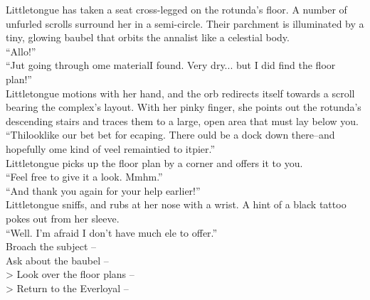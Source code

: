 Littletongue has taken a seat cross-legged on the rotunda’s floor. A number of unfurled scrolls surround her in a semi-circle. Their parchment is illuminated by a tiny, glowing baubel that orbits the annalist like a celestial body.\\

“Allo!”\\

“Ju\lisp t going through \lisp ome material\lispx I found. Very dry... but I did find the floor plan!”\\

Littletongue motions with her hand, and the orb redirects itself towards a scroll bearing the complex’s layout. With her pinky finger, she points out the rotunda’s descending stairs and traces them to a large, open area that must lay below you.\\

“Thi\lispx look\lispx like our be\lisp t bet for e\lisp caping. There \lisp ould be a dock down there--and hopefully \lisp ome kind of ve\lisp el remain\lispx tied to it\lispx pier.”\\

Littletongue picks up the floor plan by a corner and offers it to you.\\
“Feel free to give it a look. Mmhm.”\\

“And thank you again for your help earlier!”\\

Littletongue sniffs, and rubs at her nose with a wrist. A hint of a black tattoo pokes out from her sleeve.\\

“Well. I’m afraid I don’t have much el\lisp e to offer.”\\

 Broach the subject -- \\
 Ask about the baubel -- \\
> Look over the floor plans -- \\
> Return to the Everloyal -- 